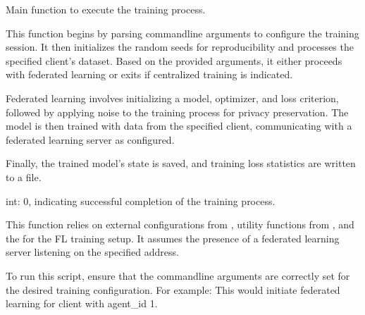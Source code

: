\documentclass[letterpaper,10pt,english]{sphinxmanual}
\begin{document}
\begin{fulllineitems}
\label{\detokenize{insur_FL_client:insur_FL_client.main}}
\pysigstartsignatures
{}
\pysigstopsignatures
\sphinxAtStartPar
Main function to execute the training process.

\sphinxAtStartPar
This function begins by parsing command\sphinxhyphen{}line arguments to configure the training session. It then initializes the random seeds for reproducibility and processes the specified client’s dataset. Based on the provided arguments, it either proceeds with federated learning or exits if centralized training is indicated.

\sphinxAtStartPar
Federated learning involves initializing a model, optimizer, and loss criterion, followed by applying noise to the training process for privacy preservation. The model is then trained with data from the specified client, communicating with a federated learning server as configured.

\sphinxAtStartPar
Finally, the trained model’s state is saved, and training loss statistics are written to a file.
\begin{description}
\sphinxAtStartPar
int: 0, indicating successful completion of the training process.

\sphinxAtStartPar
This function relies on external configurations from , utility functions from , and the  for the FL training setup. It assumes the presence of a federated learning server listening on the specified address.

\sphinxAtStartPar
To run this script, ensure that the command\sphinxhyphen{}line arguments are correctly set for the desired training configuration. For example:
This would initiate federated learning for client with agent\_id 1.

\end{description}

\end{fulllineitems}

\end{document}
